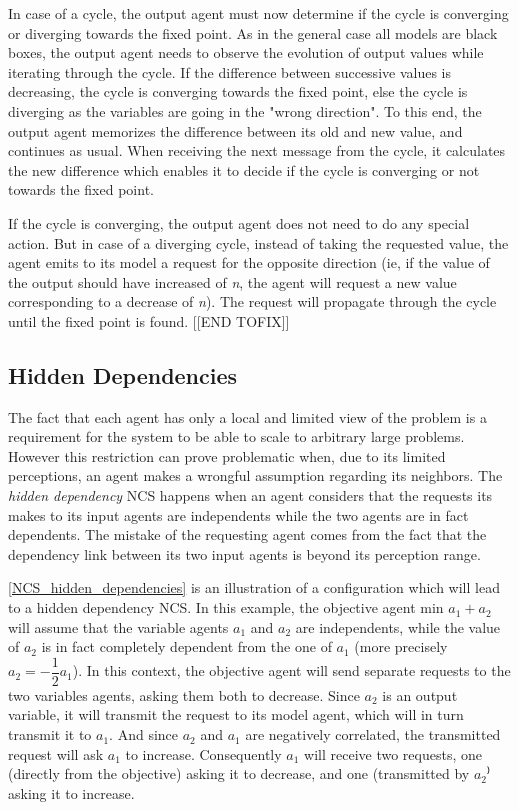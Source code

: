 In case of a cycle, the output agent must now determine if the cycle is converging or diverging towards the fixed point. As in the general case all models are black boxes, the output agent needs to observe the evolution of output values while iterating through the cycle. If the difference between successive values is decreasing, the cycle is converging towards the fixed point, else the cycle is diverging as the variables are going in the "wrong direction". To this end, the output agent memorizes the difference between its old and new value, and continues as usual. When receiving the next message from the cycle, it calculates the new difference which enables it to decide if the cycle is converging or not towards the fixed point.

If the cycle is converging, the output agent does not need to do any special action. But in case of a diverging cycle, instead of taking the requested value, the agent emits to its model a request for the opposite direction (ie, if the value of the output should have increased of \emph{n}, the agent will request a new value corresponding to a decrease of \emph{n}). The request will propagate through the cycle until the fixed point is found.
[[END TOFIX]]

\subsection{Hidden Dependencies}

The fact that each agent has only a local and limited view of the problem is a requirement for the system to be able to scale to arbitrary large problems. However this restriction can prove problematic when, due to its limited perceptions, an agent makes a wrongful assumption regarding its neighbors. The \emph{hidden dependency} NCS happens when an agent considers that the requests its makes to its input agents are independents while the two agents are in fact dependents. The mistake of the requesting agent comes from the fact that the dependency link between its two input agents is beyond its perception range.

\figurename{} \ref{NCS_hidden_dependencies} is an illustration of a configuration which will lead to a hidden dependency NCS. In this example, the objective agent $\text{min }a_1 + a_2$ will assume that the variable agents $a_1$ and $a_2$ are independents, while the value of $a_2$ is in fact completely dependent from the one of $a_1$ (more precisely $a_2 = -\dfrac{1}{2} a_1$). In this context, the objective agent will send separate requests to the two variables agents, asking them both to decrease. Since $a_2$ is an output variable, it will transmit the request to its model agent, which will in turn transmit it to $a_1$. And since $a_2$ and $a_1$ are negatively correlated, the transmitted request will ask $a_1$ to increase. Consequently $a_1$ will receive two requests, one (directly from the objective) asking it to decrease, and one (transmitted by $a_2$⁾ asking it to increase.

